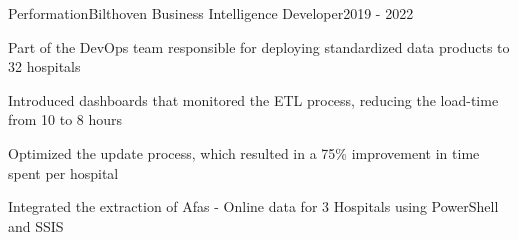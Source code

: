 \resumeSubheading
  {Performation}{Bilthoven}
  {Business Intelligence Developer}{2019 - 2022}
  \vspace{\experienceItemSpacing}
  \resumeItemListStart
\item Part of the DevOps team responsible for deploying standardized data products to 32 hospitals
\item Introduced dashboards that monitored the ETL process, reducing the load-time from 10 to 8 hours
\item Optimized the update process, which resulted in a 75\% improvement in time spent per hospital
\item Integrated the extraction of Afas - Online data for 3 Hospitals using PowerShell and SSIS
  \resumeItemListEnd 